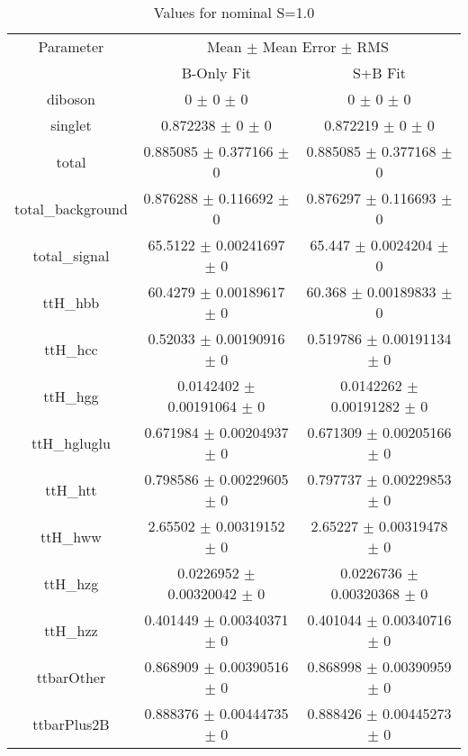 \begin{table}
\centering
\caption{Values for nominal S=1.0}
\begin{tabular}{ccc}
\toprule
Parameter & \multicolumn{2}{c}{Mean $\pm$ Mean Error $\pm$ RMS}\\
 & B-Only Fit & S+B Fit\\
\midrule
diboson & \num{0} $\pm$ \num{0} $\pm$ \num{0} & \num{0} $\pm$ \num{0} $\pm$ \num{0}\\
singlet & \num{0.872238} $\pm$ \num{0} $\pm$ \num{0} & \num{0.872219} $\pm$ \num{0} $\pm$ \num{0}\\
total & \num{0.885085} $\pm$ \num{0.377166} $\pm$ \num{0} & \num{0.885085} $\pm$ \num{0.377168} $\pm$ \num{0}\\
total\_background & \num{0.876288} $\pm$ \num{0.116692} $\pm$ \num{0} & \num{0.876297} $\pm$ \num{0.116693} $\pm$ \num{0}\\
total\_signal & \num{65.5122} $\pm$ \num{0.00241697} $\pm$ \num{0} & \num{65.447} $\pm$ \num{0.0024204} $\pm$ \num{0}\\
ttH\_hbb & \num{60.4279} $\pm$ \num{0.00189617} $\pm$ \num{0} & \num{60.368} $\pm$ \num{0.00189833} $\pm$ \num{0}\\
ttH\_hcc & \num{0.52033} $\pm$ \num{0.00190916} $\pm$ \num{0} & \num{0.519786} $\pm$ \num{0.00191134} $\pm$ \num{0}\\
ttH\_hgg & \num{0.0142402} $\pm$ \num{0.00191064} $\pm$ \num{0} & \num{0.0142262} $\pm$ \num{0.00191282} $\pm$ \num{0}\\
ttH\_hgluglu & \num{0.671984} $\pm$ \num{0.00204937} $\pm$ \num{0} & \num{0.671309} $\pm$ \num{0.00205166} $\pm$ \num{0}\\
ttH\_htt & \num{0.798586} $\pm$ \num{0.00229605} $\pm$ \num{0} & \num{0.797737} $\pm$ \num{0.00229853} $\pm$ \num{0}\\
ttH\_hww & \num{2.65502} $\pm$ \num{0.00319152} $\pm$ \num{0} & \num{2.65227} $\pm$ \num{0.00319478} $\pm$ \num{0}\\
ttH\_hzg & \num{0.0226952} $\pm$ \num{0.00320042} $\pm$ \num{0} & \num{0.0226736} $\pm$ \num{0.00320368} $\pm$ \num{0}\\
ttH\_hzz & \num{0.401449} $\pm$ \num{0.00340371} $\pm$ \num{0} & \num{0.401044} $\pm$ \num{0.00340716} $\pm$ \num{0}\\
ttbarOther & \num{0.868909} $\pm$ \num{0.00390516} $\pm$ \num{0} & \num{0.868998} $\pm$ \num{0.00390959} $\pm$ \num{0}\\
ttbarPlus2B & \num{0.888376} $\pm$ \num{0.00444735} $\pm$ \num{0} & \num{0.888426} $\pm$ \num{0.00445273} $\pm$ \num{0}\\

\end{tabular}
\end{table}
